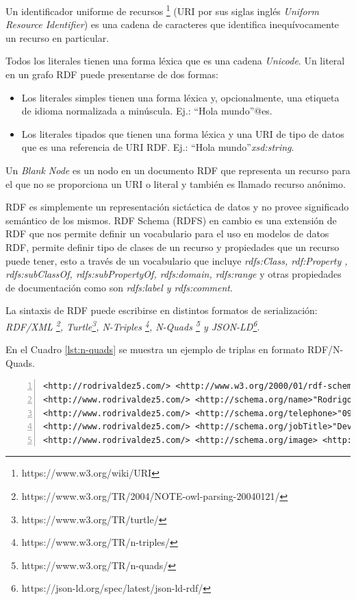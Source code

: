 Un identificador uniforme de recursos \footnote{https://www.w3.org/wiki/URI} (URI por sus siglas inglés \textit{Uniform Resource Identifier}) es una cadena de caracteres que identifica inequívocamente un recurso en particular. 

Todos los literales tienen una forma léxica que es una cadena \textit{Unicode}. Un literal en un grafo RDF puede presentarse de dos formas:
\begin{itemize}
    \item Los literales simples tienen una forma léxica y, opcionalmente, una etiqueta de idioma normalizada a minúscula. Ej.: “Hola mundo”@es.
    \item Los literales tipados que tienen una forma léxica y una URI de tipo de datos que es una referencia de URI RDF. Ej.: “Hola mundo”\textit{xsd:string}.
\end{itemize}

Un \textit{Blank Node} es un nodo en un documento RDF que representa un recurso para el que no se proporciona un URI o literal y también es llamado recurso anónimo.

RDF es simplemente un representación sictáctica de datos y no provee significado semántico de los mismos. RDF Schema (RDFS) en cambio es una extensión de RDF que nos permite definir un vocabulario para el uso en modelos de datos RDF, permite definir tipo de clases de un recurso y propiedades que un recurso puede tener, esto a través de un vocabulario que incluye\textit{ rdfs:Class, rdf:Property , rdfs:subClassOf, rdfs:subPropertyOf, rdfs:domain, rdfs:range} y otras propiedades de documentación como son \textit{rdfs:label y rdfs:comment}.

La sintaxis de RDF puede escribirse en distintos formatos de serialización: \textit{RDF/XML \footnote{https://www.w3.org/TR/2004/NOTE-owl-parsing-20040121/}, Turtle\footnote{https://www.w3.org/TR/turtle/}, N-Triples \footnote{https://www.w3.org/TR/n-triples/}, N-Quads \footnote{https://www.w3.org/TR/n-quads/} y JSON-LD\footnote{https://json-ld.org/spec/latest/json-ld-rdf/}}.

En el Cuadro \ref{lst:n-quads} se muestra un ejemplo de triplas en formato RDF/N-Quads. \hfill \break

\lstset{language=XML}
    
\noindent\begin{minipage}{\textwidth}
\begin{lstlisting}[captionpos=b, caption=Ejemplo en RDF/N-Quads, label=lst:n-quads,  numbers=left,  numberstyle=\tiny\color{mygray},frame=single]
<http://rodrivaldez5.com/> <http://www.w3.org/2000/01/rdf-schema#type> <http://schema.org/person> .  
<http://www.rodrivaldez5.com/> <http://schema.org/name>"Rodrigo Valdez" .
<http://www.rodrivaldez5.com/> <http://schema.org/telephone>"0981530572" .
<http://www.rodrivaldez5.com/> <http://schema.org/jobTitle>"Developer" .
<http://www.rodrivaldez5.com/> <http://schema.org/image> <http://www.rodrivaldez5.com/images/rodri.png> .
\end{lstlisting}
\end{minipage}

